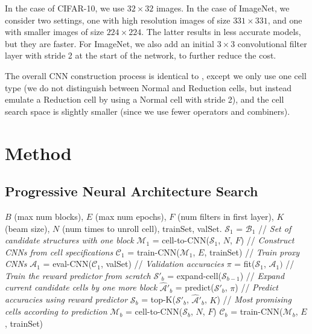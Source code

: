 \documentclass[runningheads]{llncs}
\begin{document}
In the case of CIFAR-10, we use $32 \times 32$ images.
In the case of ImageNet, we consider two settings,
one with high resolution images of size $331 \times 331$,
and one with smaller images of size $224 \times 224$.
The latter results in less accurate models, but they are faster.
For ImageNet,
we also add an initial $3 \times 3$ convolutional filter layer  with stride 2 at the start of the network, to further reduce the cost.

The overall CNN construction process is identical to  \cite{DBLP:journals/corr/ZophVSL17},
except we only use one cell type (we do not distinguish between Normal and Reduction cells, but instead emulate a Reduction cell by using a Normal cell with stride 2),
and the cell search space is slightly smaller (since we use fewer operators and combiners).

\section{Method}\label{sec:methods}\label{sec:method}\subsection{Progressive Neural Architecture Search}\label{sec:pnas}\begin{algorithm}[t]
\begin{algorithmic}
$B$ (max num blocks),
$E$ (max num epochs),
$F$ (num filters in first layer),
$K$ (beam size),
$N$ (num times to unroll cell),
trainSet,
valSet.
\STATE $\mathcal{S}_1$ = $\mathcal{B}_1$ // {\it Set of candidate structures with one block}
\STATE $\mathcal{M}_1$ = cell-to-CNN($\mathcal{S}_1$, $N$, $F$) // {\it Construct CNNs from cell specifications}
\STATE $\mathcal{C}_1$ = train-CNN($\mathcal{M}_1$, $E$, trainSet) //  {\it Train proxy CNNs}
\STATE $\mathcal{A}_1$ = eval-CNN($\mathcal{C}_1$, valSet) //  {\it Validation accuracies}
\STATE $\pi$ = fit($\mathcal{S}_1$, $\mathcal{A}_1)$ // {\it Train the reward predictor from scratch}
\STATE $\mathcal{S}'_b$ = expand-cell($\mathcal{S}_{b-1}$) // {\it Expand current candidate cells by one more block}
\STATE $\hat{\mathcal{A}}'_b$ = predict($\mathcal{S}'_b$, $\pi$) // {\it Predict accuracies using reward predictor}
\STATE $\mathcal{S}_b$ = top-K($\mathcal{S}'_b$, $\hat{\mathcal{A}}'_b$, $K$) // {\it Most promising cells according to prediction}
\STATE $\mathcal{M}_b$ = cell-to-CNN($\mathcal{S}_b$, $N$, $F$)
\STATE $\mathcal{C}_b$ = train-CNN($\mathcal{M}_b$, $E$, trainSet) 

\end{algorithmic}
\end{algorithm}
\end{document}
